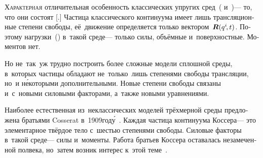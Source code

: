 \begin{otherlanguage}{russian}

\lettrine[lines=2, findent=2pt, nindent=0pt]{Х}{арактерная} отличительная особенность классических упругих сред~( и~)\:--- то, что они состоят [.] Частица классического континуума имеет лишь трансляционные степени свободы, её~движение определяется только вектором~${\bm{R}(q^i \hspace{-0.15em}, t)}$. Поэтому нагрузки~() в~такой среде\:--- только силы, объёмные и~поверхностные. Моментов нет.

Но не~так~уж трудно построить более сложные модели сплошной среды, в~которых частицы обладают не~только~лишь степенями свободы трансляции, но~и н\'{е}которыми дополнительными. Новые степени свободы связаны и~с~новыми силовыми факторами, а~также новыми уравнениями.

Наиболее естественная из~неклассических моделей трёхмерной среды предложена братьями Cosserat в~1909\:год\'{у}~\cite{cosserat}. Каждая частица континуума Коссера\:--- это элементарное твёрдое тело с~шестью степенями свободы. Силовые факторы в~такой среде\:--- силы и~моменты. Работа братьев Коссера оставалась незамеченной полвека, но~затем возник интерес к~этой теме~\cite{mindlin.tiersten, nowacki-elasticity}.

\end{otherlanguage}

\vspace{2mm}

